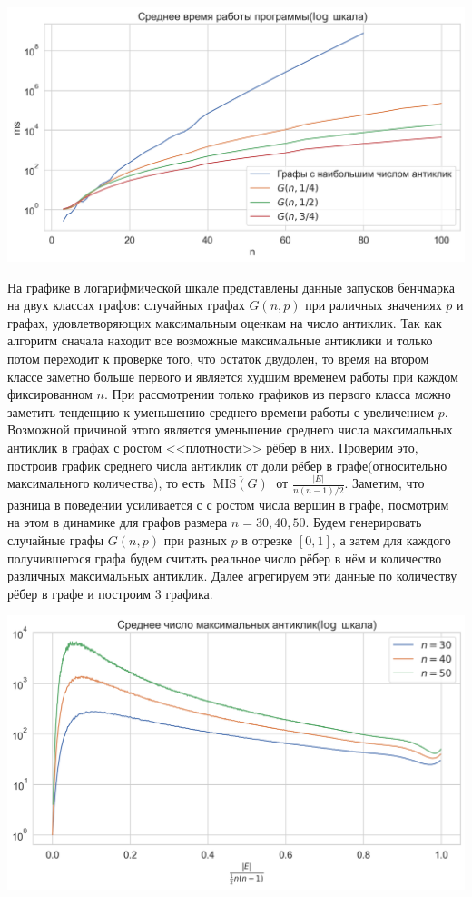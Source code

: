 \documentclass{article}
\begin{document}
\begin{center}
\includegraphics[scale=0.6]{plot.png}
\end{center}

На графике в логарифмической шкале представлены данные запусков бенчмарка на двух классах графов: случайных графах $G(n, p)$ при раличных значениях $p$ и
графах, удовлетворяющих максимальным оценкам на число антиклик. Так как алгоритм сначала находит все возможные максимальные антиклики и
только потом переходит к проверке того, что остаток двудолен, то время на втором классе заметно больше первого и является худшим временем работы при
каждом фиксированном $n$. При рассмотрении только графиков из первого класса можно заметить тенденцию к уменьшению среднего времени работы с увеличением $p$.
Возможной причиной этого является уменьшение среднего числа максимальных антиклик в графах с ростом <<плотности>> рёбер в них. Проверим это, построив
график среднего числа антиклик от доли рёбер в графе(относительно максимального количества), то есть $\overline{|\text{MIS}(G)|}$ от $\frac{|E|}{n(n-1)/2}$. Заметим, что разница в поведении усиливается с
с ростом числа вершин в графе, посмотрим на этом в динамике для графов размера $n=30, 40, 50$. Будем генерировать случайные графы $G(n, p)$ при разных $p$ в отрезке $[0, 1]$, а затем для каждого получившегося графа
будем считать реальное число рёбер в нём и количество различных максимальных антиклик. Далее агрегируем эти данные по количеству рёбер в графе и построим 3 графика.

\begin{center}
\includegraphics[scale=0.6]{plot1.png}
\end{center}
\end{document}
